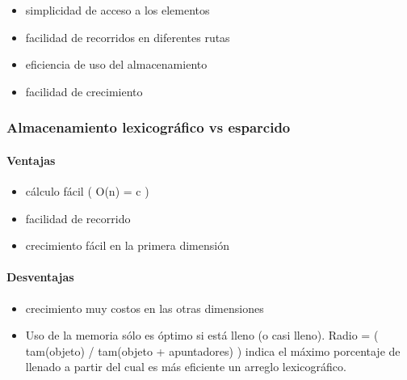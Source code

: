 \begin{itemize}
\item simplicidad de acceso a los elementos
\item facilidad de recorridos en diferentes rutas
\item eficiencia de uso del almacenamiento
\item facilidad de crecimiento
\end{itemize}

\subsubsection{Almacenamiento lexicográfico vs esparcido}
\label{sec:almac-lexic-vs}

\paragraph{Ventajas}
\label{sec:ventajas}

\begin{itemize}
\item cálculo fácil ( O(n) = c )
\item facilidad de recorrido
\item crecimiento fácil en la primera dimensión
\end{itemize}

\paragraph{Desventajas}
\label{sec:desventajas}

\begin{itemize}
\item crecimiento muy costos en las otras dimensiones
\item Uso de la memoria sólo es óptimo si está lleno (o casi lleno).
  Radio = ( tam(objeto) / tam(objeto + apuntadores) ) indica el máximo
  porcentaje de llenado a partir del cual es más eficiente un arreglo
  lexicográfico.
\end{itemize}





